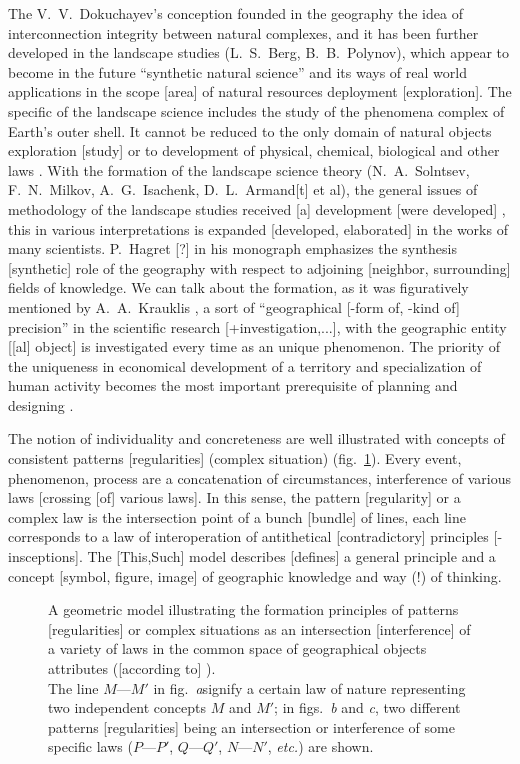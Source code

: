 \documentclass[12pt,leqno]{book}
\begin{document}
The V.~V.~Dokuchayev's conception founded in the geography the idea of interconnection integrity between natural complexes, and it has been further developed in the landscape studies (L.~S.~Berg, B.~B.~Polynov), which appear to become in the future ``synthetic natural science'' and its ways of real world applications in the scope [area] of natural resources deployment [exploration]. The specific of the landscape science includes the study of the phenomena complex of Earth's outer shell. It cannot be reduced to the only domain of natural objects exploration [study] or to development of physical, chemical, biological and other laws \cite{b285}. With the formation of the landscape science theory (N.~A.~Solntsev, F.~N.~Milkov, A.~G.~Isachenk, D.~L.~Armand[t] et al), the general issues of methodology of the landscape studies received [a] development [were developed] \cite{b288}, this in various interpretations is expanded [developed, elaborated] in the works of many scientists. P.~Hagret [?] in his monograph \cite{b450}  emphasizes the synthesis [synthetic] role of the geography with respect to adjoining [neighbor, surrounding] fields of knowledge. We can talk about the formation, as it was figuratively mentioned by A.~A.~Krauklis \cite[p.~206]{b227}, a sort of ``geographical [-form of, -kind of] precision'' in the scientific research [+investigation,...], with the geographic entity [[al] object] is investigated every time as an unique phenomenon. The priority of the uniqueness in economical development of a territory and specialization of human activity becomes the most important prerequisite of planning and designing \cite{b351}.

The notion of individuality and concreteness are well illustrated with concepts of consistent patterns [regularities] (complex situation) (fig.~\ref{fig:1}). Every event, phenomenon, process are a concatenation of circumstances, interference of various laws [crossing [of] various laws]. In this sense, the pattern [regularity] or a complex law is the intersection point of a bunch [bundle] of lines, each line corresponds to a law of interoperation of antithetical [contradictory] principles [-insceptions]. The [This,Such] model describes [defines] a general principle and a concept [symbol, figure, image] of geographic knowledge and way (!) of thinking.

\begin{figure}[tbhp]
\caption{A geometric model illustrating the formation principles of patterns [regularities] or complex situations as an intersection [interference] of a variety of laws in the common space of geographical objects attributes ([according to] \cite{b24}).\\ The line $M\mbox{---}M\prime{}$ in fig.~\emph{a}signify a certain law of nature representing two independent concepts $M$ and $M\prime{}$; in figs.~\emph{b} and \emph{c}, two different patterns [regularities] being an intersection or interference of some specific laws ($P\mbox{---}P\prime{}$, $Q\mbox{---}Q\prime{}$, $N\mbox{---}N\prime{}$, \emph{etc.}) are shown.  } \label{fig:1}
\end{figure}
\end{document}
